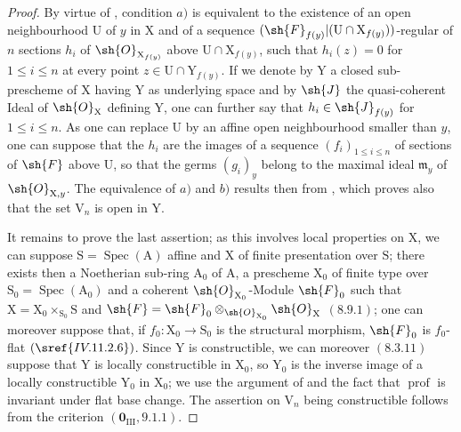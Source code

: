 \begin{proof}
By virtue of , condition $a)$ is equivalent to the existence of an open neighbourhood $\mathrm{U}$ of $y$ in $\mathrm{X}$ and of a sequence $(\sh{F}_{f(y)}|(\mathrm{U}\cap\mathrm{X}_{f(y)}))$-regular of $n$ sections $h_i$ of $\sh{O}_{\mathrm{X}_{f(y)}}$ above $\mathrm{U}\cap\mathrm{X}_{f(y)}$, such that $h_i(z)=0$ for $1\leqslant i\leqslant n$ at every point $z\in\mathrm{U}\cap\mathrm{Y}_{f(y)}$. If we denote by $\mathrm{Y}$ a closed sub-prescheme of $\mathrm{X}$ having $\mathrm{Y}$ as underlying space and by $\sh{J}$ the quasi-coherent Ideal of $\sh{O}_\mathrm{X}$ defining $\mathrm{Y}$, one can further say that $h_i\in\sh{J}_{f(y)}$ for $1\leqslant i\leqslant n$. As one can replace $\mathrm{U}$ by an affine open neighbourhood smaller than $y$, one can suppose that the $h_i$ are the images of a sequence $(f_i)_{1\leqslant i\leqslant n}$ of sections of $\sh{F}$ above $\mathrm{U}$, so that the germs $(g_i)_y$ belong to the maximal ideal $\mathfrak{m}_y$ of $\sh{O}_{\mathrm{X},y}$. The equivalence of $a)$ and $b)$ results then from , which proves also that the set $\mathrm{V}_n$ is open in $\mathrm{Y}$.

It remains to prove the last assertion; as this involves local properties on $\mathrm{X}$, we can suppose $\mathrm{S}=\operatorname{Spec}(\mathrm{A})$ affine and $\mathrm{X}$ of finite presentation over $\mathrm{S}$; there exists then a Noetherian sub-ring $\mathrm{A}_0$ of $\mathrm{A}$, a prescheme $\mathrm{X}_0$ of finite type over $\mathrm{S}_0=\operatorname{Spec}(\mathrm{A}_0)$ and a coherent $\sh{O}_{\mathrm{X}_0}$-Module $\sh{F}_0$ such that $\mathrm{X}=\mathrm{X}_0\times_{\mathrm{S}_0}\mathrm{S}$ and $\sh{F}=\sh{F}_0\otimes_{\sh{O}_{\mathrm{X}_0}}\sh{O}_\mathrm{X}$ $(8.9.1)$; one can moreover suppose that, if $f_0:\mathrm{X}_0\to\mathrm{S}_0$ is the structural morphism, $\sh{F}_0$ is $f_0$-flat $(\sref{IV.11.2.6})$. Since $\mathrm{Y}$ is constructible, we can moreover $(8.3.11)$ suppose that $\mathrm{Y}$ is locally constructible in $\mathrm{X}_0$, so $\mathrm{Y}_0$ is the inverse image of a locally constructible $\mathrm{Y}_0$ in $\mathrm{X}_0$; we use the argument of  and the fact that $\operatorname{prof}$ is invariant under flat base change. The assertion on $\mathrm{V}_n$ being constructible follows from the criterion $(\mathbf{0}_\mathrm{III},9.1.1)$.
\end{proof}
